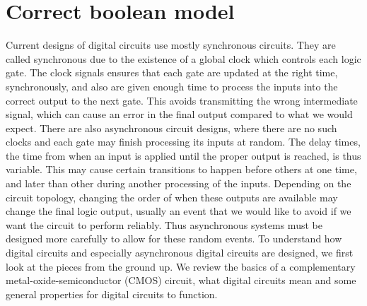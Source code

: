 \documentclass{article}
\begin{document}
\section{Correct boolean model}
Current designs of digital circuits use mostly synchronous circuits.  They are called synchronous due to the existence of a global clock which controls each logic gate.  The clock signals ensures that each gate are updated at the right time, synchronously, and also are given enough time to process the inputs into the correct output to the next gate. This avoids transmitting the wrong intermediate signal, which can cause an error in the final output compared to what we would expect.  There are also asynchronous circuit designs, where there are no such clocks and each gate may finish processing its inputs at random.  The delay times, the time from when an input is applied until the proper output is reached, is thus variable.  This may cause certain transitions to happen before others at one time, and later than other during another processing of the inputs.  Depending on the circuit topology, changing the order of when these outputs are available may change the final logic output, usually an event that we would like to avoid if we want the circuit to perform reliably.  Thus asynchronous systems must be designed more carefully to allow for these random events.  To understand how digital circuits and especially asynchronous digital circuits are designed, we first look at the pieces from the ground up.  We review the basics of a complementary metal-oxide-semiconductor (CMOS) circuit, what digital circuits mean and some general properties for digital circuits to function.
\newline \newline
\end{document}
